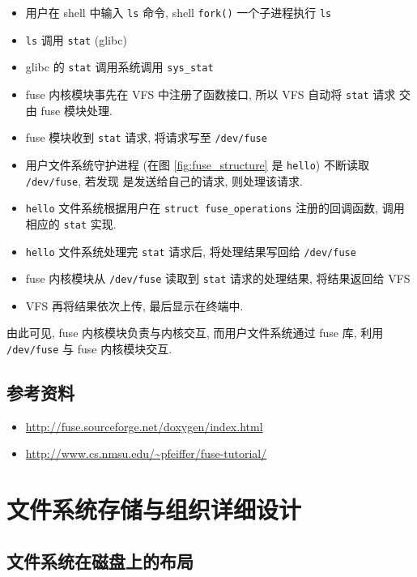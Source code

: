 \documentclass[nofonts]{ctexart}
\begin{document}
\begin{itemize}
\item
  用户在 shell 中输入 \texttt{ls} 命令, shell \texttt{fork()}
  一个子进程执行 \texttt{ls}
\item
  \texttt{ls} 调用 \texttt{stat} (glibc)
\item
  glibc 的 \texttt{stat} 调用系统调用 \texttt{sys\_stat}
\item
  fuse 内核模块事先在 VFS 中注册了函数接口, 所以 VFS 自动将
  \texttt{stat} 请求 交由 fuse 模块处理.
\item
  fuse 模块收到 \texttt{stat} 请求, 将请求写至 \texttt{/dev/fuse}
\item
    用户文件系统守护进程 (在图 \ref{fig:fuse_structure}
    是 \texttt{hello}) 不断读取
  \texttt{/dev/fuse}, 若发现 是发送给自己的请求, 则处理该请求.
\item
  \texttt{hello} 文件系统根据用户在 \texttt{struct fuse\_operations}
  注册的回调函数, 调用 相应的 \texttt{stat} 实现.
\item
  \texttt{hello} 文件系统处理完 \texttt{stat} 请求后, 将处理结果写回给
  \texttt{/dev/fuse}
\item
  fuse 内核模块从 \texttt{/dev/fuse} 读取到 \texttt{stat}
  请求的处理结果, 将结果返回给 VFS
\item
  VFS 再将结果依次上传, 最后显示在终端中.
\end{itemize}

由此可见, fuse 内核模块负责与内核交互, 而用户文件系统通过 fuse 库, 利用
\texttt{/dev/fuse} 与 fuse 内核模块交互.

\subsection{参考资料}\label{ux53c2ux8003ux8d44ux6599}

\begin{itemize}
\item
    \url{http://fuse.sourceforge.net/doxygen/index.html}
\item
    \url{http://www.cs.nmsu.edu/~pfeiffer/fuse-tutorial/}
\end{itemize}

\section{文件系统存储与组织详细设计}\label{ux6587ux4ef6ux7cfbux7edfux5b58ux50a8ux4e0eux7ec4ux7ec7ux8be6ux7ec6ux8bbeux8ba1}

\subsection{文件系统在磁盘上的布局}\label{ux6587ux4ef6ux7cfbux7edfux5728ux78c1ux76d8ux4e0aux7684ux5e03ux5c40}
\end{document}
